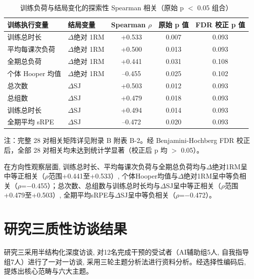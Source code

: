 \begin{table}[htbp]
\centering
\caption{训练负荷与结局变化的探索性 Spearman 相关（原始 p $<$ 0.05 组合）}
\label{tab:spearman}
\begin{threeparttable}
\begin{tabular}{@{}llccc@{}}
\toprule
\textbf{训练执行变量} & \textbf{结局变量} & \textbf{Spearman $\rho$} & \textbf{原始 p 值} & \textbf{FDR 校正 p 值} \\
\midrule
训练总时长        & $\Delta$绝对 1RM & +0.533 & 0.007 & 0.093 \\
平均每课次负荷    & $\Delta$绝对 1RM & +0.500 & 0.013 & 0.093 \\
全期总负荷        & $\Delta$绝对 1RM & +0.441 & 0.031 & 0.108 \\
个体 Hooper 均值  & $\Delta$绝对 1RM & --0.455 & 0.025 & 0.102 \\
总次数            & $\Delta$SJ       & +0.503 & 0.012 & 0.093 \\
总组数            & $\Delta$SJ       & +0.479 & 0.018 & 0.093 \\
训练总时长        & $\Delta$SJ       & +0.494 & 0.014 & 0.093 \\
全期平均 sRPE     & $\Delta$SJ       & --0.472 & 0.020 & 0.093 \\
\bottomrule
\end{tabular}
\begin{tablenotes}[flushleft]\footnotesize
\item 注：完整 28 对相关矩阵详见附录 B 附表 B-2。经 Benjamini-Hochberg FDR 校正后，全部 28 对相关均未达到统计学显著（校正后 p 均 $>$ 0.05）。
\end{tablenotes}
\end{threeparttable}
\end{table}

在方向性观察层面, 训练总时长、平均每课次负荷与全期总负荷均与$\Delta$绝对1RM呈中等正相关（$\rho$范围+0.441至+0.533）, 个体Hooper均值与$\Delta$绝对1RM呈中等负相关（$\rho$=$-$0.455）；总次数、总组数与训练总时长均与$\Delta$SJ呈中等正相关（$\rho$范围+0.479至+0.503）, 全期平均sRPE与$\Delta$SJ呈中等负相关（$\rho$=$-$0.472）。

\section{研究三质性访谈结果}
\label{sec:study3_qualitative}

研究三采用半结构化深度访谈, 对12名完成干预的受试者（AI辅助组5人, 自我指导组7人）进行了一对一访谈, 采用三轮主题分析法进行资料分析。经选择性编码后, 提炼出核心范畴与六大主题。

